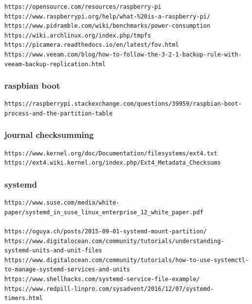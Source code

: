 \documentclass[10pt,a4paper]{article}
\begin{document}
\begin{scriptsize}
\begin{verbatim}
https://opensource.com/resources/raspberry-pi
https://www.raspberrypi.org/help/what-%20is-a-raspberry-pi/
https://www.pidramble.com/wiki/benchmarks/power-consumption
https://wiki.archlinux.org/index.php/tmpfs
https://picamera.readthedocs.io/en/latest/fov.html
https://www.veeam.com/blog/how-to-follow-the-3-2-1-backup-rule-with-veeam-backup-replication.html
\end{verbatim}
\end{scriptsize}

\subsubsection{raspbian boot}

\begin{scriptsize}
\begin{verbatim}
https://raspberrypi.stackexchange.com/questions/39959/raspbian-boot-process-and-the-partition-table
\end{verbatim}
\end{scriptsize}

\subsubsection{journal checksumming}

\begin{scriptsize}
\begin{verbatim}
https://www.kernel.org/doc/Documentation/filesystems/ext4.txt
https://ext4.wiki.kernel.org/index.php/Ext4_Metadata_Checksums
\end{verbatim}
\end{scriptsize}

\subsubsection{systemd}

\begin{scriptsize}
\begin{verbatim}
https://www.suse.com/media/white-paper/systemd_in_suse_linux_enterprise_12_white_paper.pdf   

https://oguya.ch/posts/2015-09-01-systemd-mount-partition/
https://www.digitalocean.com/community/tutorials/understanding-systemd-units-and-unit-files
https://www.digitalocean.com/community/tutorials/how-to-use-systemctl-to-manage-systemd-services-and-units
https://www.shellhacks.com/systemd-service-file-example/
https://www.redpill-linpro.com/sysadvent/2016/12/07/systemd-timers.html
\end{verbatim}
\end{scriptsize}
\end{document}

